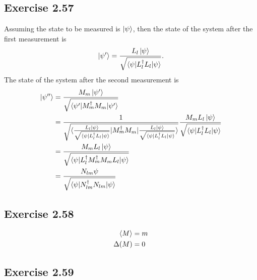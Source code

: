 \documentclass{article}
\begin{document}
\subsection*{Exercise 2.57}

Assuming the state to be measured is $\ket{\psi}$, then the state of the system after the first measurement is \[\ket{\psi'} = \frac{L_l \ket{\psi}}{\sqrt{\braket{\psi | L_l^\dagger L_l | \psi}}}.\] The state of the system after the second measurement is \begin{align*}
  \ket{\psi''} & = \frac{M_m \ket{\psi'}}{\sqrt{\braket{\psi' | M_m^\dagger M_m | \psi'}}}                                                                                                                                                                                          \\
               & = \frac{1}{\sqrt{\braket{\frac{L_l \ket{\psi}}{\sqrt{\braket{\psi | L_l^\dagger L_l | \psi}}} | M_m^\dagger M_m | \frac{L_l \ket{\psi}}{\sqrt{\braket{\psi | L_l^\dagger L_l | \psi}}}}}} \frac{M_m L_l \ket{\psi}}{\sqrt{\braket{\psi | L_l^\dagger L_l | \psi}}} \\
               & = \frac{M_m L_l \ket{\psi}}{\sqrt{\braket{\psi | L_l^\dagger M_m^\dagger M_m L_l | \psi}}}                                                                                                                                                                         \\
               & = \frac{N_{l m} \psi}{\sqrt{\braket{\psi | N_{l m}^\dagger N_{l m} | \psi}}}
\end{align*}

\subsection*{Exercise 2.58}

\begin{align*}
  \braket{M} & = m \\
  \Delta(M)  & = 0
\end{align*}

\subsection*{Exercise 2.59}
\end{document}
